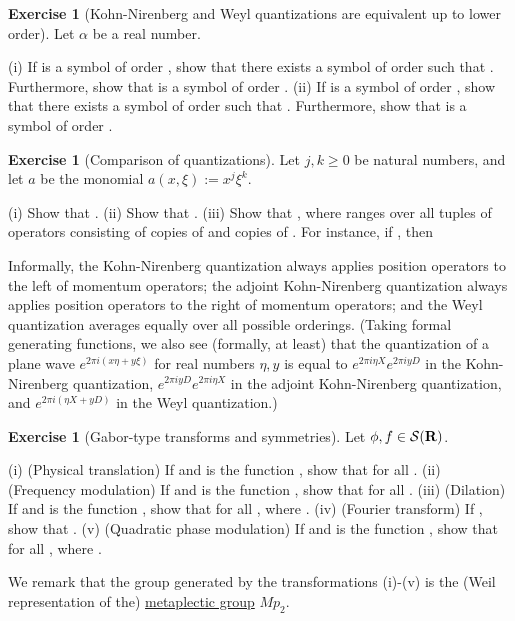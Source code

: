 \documentclass[11pt]{article}
\theoremstyle{definition}
\newtheorem{exercise}[theorem]{Exercise}
\theoremstyle{remark}
\begin{document}
\begin{exercise}[Kohn-Nirenberg and Weyl quantizations are equivalent up to lower order]
 \label{knw} Let \({\alpha}\) be a real number. 

(i) If  is a symbol of order , show that there exists a symbol  of order  such that . Furthermore, show that  is a symbol of order . 
(ii) If  is a symbol of order , show that there exists a symbol  of order  such that . Furthermore, show that  is a symbol of order .



\end{exercise}
\begin{exercise}[Comparison of quantizations]
  Let \({j,k \geq 0}\) be natural numbers, and let \({a}\) be the monomial \({a(x,\xi) := x^j \xi^k}\). 

(i) Show that . 
(ii) Show that . 
(iii) Show that , where  ranges over all tuples of operators consisting of  copies of  and  copies of . For instance, if , then



 Informally, the Kohn-Nirenberg quantization always applies position operators to the left of momentum operators; the adjoint Kohn-Nirenberg quantization always applies position operators to the right of momentum operators; and the Weyl quantization averages equally over all possible orderings. (Taking formal generating functions, we also see (formally, at least) that the quantization of a plane wave \({e^{2\pi i (x \eta + y \xi)}}\) for real numbers \({\eta,y}\) is equal to \({e^{2\pi i \eta X} e^{2\pi i y D}}\) in the Kohn-Nirenberg quantization, \({e^{2\pi i yD} e^{2\pi i \eta X}}\) in the adjoint Kohn-Nirenberg quantization, and \({e^{2\pi i(\eta X + yD)}}\) in the Weyl quantization.) 
\end{exercise}
\begin{exercise}[Gabor-type transforms and symmetries]
  Let \({\phi, f \in {\mathcal S}({\bf R})}\). 

(i) (Physical translation) If  and  is the function , show that  for all . 
(ii) (Frequency modulation) If  and  is the function , show that  for all . 
(iii) (Dilation) If  and  is the function , show that  for all , where . 
(iv) (Fourier transform) If , show that . 
(v) (Quadratic phase modulation) If  and  is the function , show that  for all , where .


 We remark that the group generated by the transformations (i)-(v) is the (Weil representation of the) \href{https://en.wikipedia.org/wiki/Metaplectic_group}{metaplectic group} \({Mp_2}\). 
\end{exercise}
\end{document}
